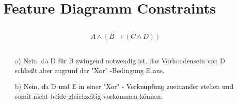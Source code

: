 \chapter{Feature Diagramm Constraints}
\section{}
\begin{align*}
	A \wedge(B \rightarrow (C \wedge D))
\end{align*}

\section{}
  \begin{enumerate}
  	\item[a)] Nein, da D für B zwingend notwendig ist, das Vorhandensein von D schließt aber augrunf der "Xor" -Bedingung E aus.
  	\item[b)] Nein, da D und E in einer "Xor" - Verknüpfung zueinander stehen und somit nicht beide gleichzeitig vorkommen können.
  \end{enumerate}
